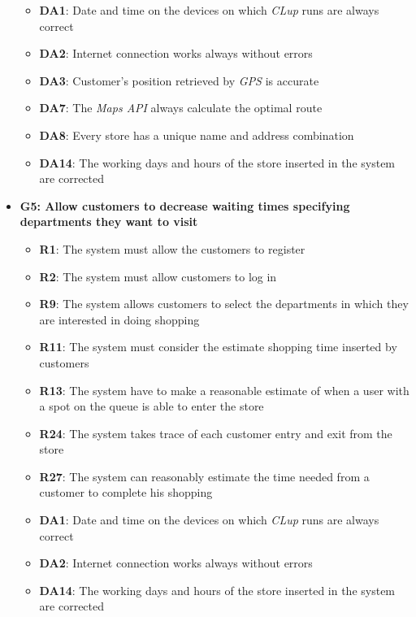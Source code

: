 \documentclass{article}
\begin{document}
\begin{itemize}
\begin{itemize}
						\item {\bfseries DA1}: Date and time on the devices on which \emph{CLup} runs are always correct
						\item {\bfseries DA2}: Internet connection works always without errors
						\item {\bfseries DA3}: Customer’s position retrieved by \emph{GPS} is accurate
						\item {\bfseries DA7}: The \emph{Maps API} always calculate the optimal route 
						\item {\bfseries DA8}: Every store has a unique name and address combination
						\item {\bfseries DA14}: The working days and hours of the store inserted in the system are corrected
						
					\end{itemize}

				\item {\bfseries G5: Allow customers to decrease waiting times specifying departments they want to visit}	

					\begin{itemize}
						
						\item {\bfseries R1}: The system must allow the customers to register
						\item {\bfseries R2}: The system must allow customers to log in
						\item {\bfseries R9}: The system allows customers to select the departments in which they are interested in doing shopping
						\item {\bfseries R11}: The system must consider the estimate shopping time inserted by customers
						\item {\bfseries R13}: The system have to make a reasonable estimate of when a user with a spot on the queue is able to enter the store
						\item {\bfseries R24}: The system takes trace of each customer entry and exit from the store
						\item {\bfseries R27}: The system can reasonably estimate the time needed from a customer to complete his shopping \\
						
						\item {\bfseries DA1}: Date and time on the devices on which \emph{CLup} runs are always correct
						\item {\bfseries DA2}: Internet connection works always without errors
						\item {\bfseries DA14}: The working days and hours of the store inserted in the system are corrected
						

\end{itemize}
\end{itemize}
\end{document}
